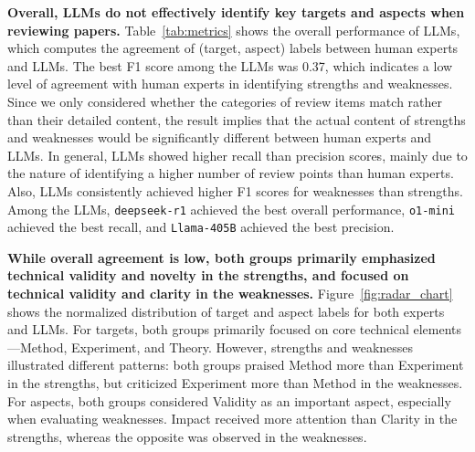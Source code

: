 
\textbf{Overall, LLMs do not effectively identify key targets and aspects when reviewing papers.} Table~\ref{tab:metrics} shows the overall performance of LLMs, which computes the agreement of (target, aspect) labels between human experts and LLMs. The best F1 score among the LLMs was 0.37, which indicates a low level of agreement with human experts in identifying strengths and weaknesses. Since we only considered whether the categories of review items match rather than their detailed content, the result implies that the actual content of strengths and weaknesses would be significantly different between human experts and LLMs. In general, LLMs showed higher recall than precision scores, mainly due to the nature of identifying a higher number of review points than human experts. Also, LLMs consistently achieved higher F1 scores for weaknesses than strengths. Among the LLMs, \texttt{deepseek-r1} achieved the best overall performance, \texttt{o1-mini} achieved the best recall, and \texttt{Llama-405B} achieved the best precision.

\textbf{While overall agreement is low, both groups primarily emphasized technical validity and novelty in the strengths, and focused on technical validity and clarity in the weaknesses.} Figure~\ref{fig:radar_chart} shows the normalized distribution of target and aspect labels for both experts and LLMs. For targets, both groups primarily focused on core technical elements---Method, Experiment, and Theory. However, strengths and weaknesses illustrated different patterns: both groups praised Method more than Experiment in the strengths, but criticized Experiment more than Method in the weaknesses. For aspects, both groups considered Validity as an important aspect, especially when evaluating weaknesses. Impact received more attention than Clarity in the strengths, whereas the opposite was observed in the weaknesses.

